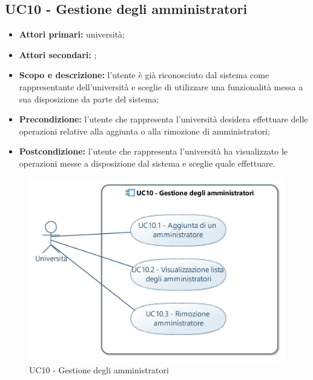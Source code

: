 \documentclass[AnalisiDeiRequisiti.tex]{subfiles}
\begin{document}
\subsection{UC10 - Gestione degli amministratori}
\begin{itemize}
	\item \textbf{Attori primari:} università;
	\item \textbf{Attori secondari:} ;
	\item \textbf{Scopo e descrizione:} l'utente è già riconosciuto dal sistema come rappresentante dell'università e sceglie di utilizzare una funzionalità messa a sua disposizione da parte del sistema;
	\item \textbf{Precondizione:} l'utente che rappresenta l'università desidera effettuare delle operazioni relative alla aggiunta o alla rimozione di amministratori;
	\item \textbf{Postcondizione:} l'utente che rappresenta l'università ha visualizzato le operazioni messe a disposizione dal sistema e sceglie quale effettuare.
\end{itemize}

\begin{figure}[H]
	\centering
	\includegraphics[width=1.0\linewidth]{UC10.jpg}
	\caption{UC10 - Gestione degli amministratori}
	\label{fig:UC10 - Gestione degli amministratori}
\end{figure}
\end{document}
